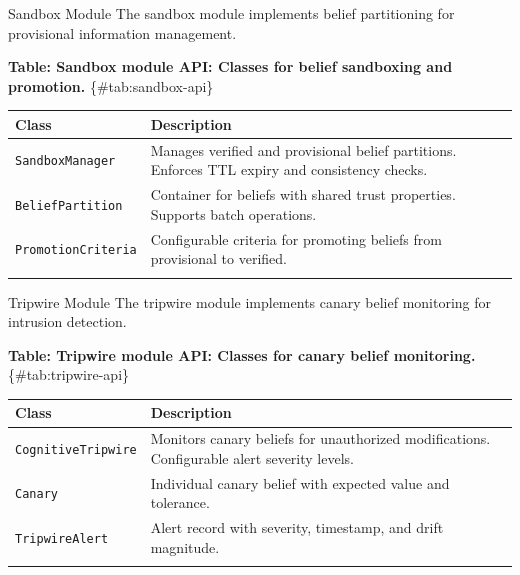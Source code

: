 \documentclass[
  ignorenonframetext,
]{beamer}
\newcounter{none} %
\begin{document}
\begin{frame}{Sandbox Module}
\protect{}\label{sec:sandbox-api}
The sandbox module implements belief partitioning for provisional
information management.

\textbf{Table: Sandbox module API: Classes for belief sandboxing and
promotion.} \{\#tab:sandbox-api\}

{\def\LTcaptype{none} %
\begin{longtable}[]{@{}
  >{\raggedright\arraybackslash}p{}
  >{\raggedright\arraybackslash}p{}@{}}
\toprule\noalign{}
\begin{minipage}[b]{\linewidth}\raggedright
Class
\end{minipage} & \begin{minipage}[b]{\linewidth}\raggedright
Description
\end{minipage} \\
\midrule\noalign{}
\endhead
\texttt{SandboxManager} & Manages verified and provisional belief
partitions. Enforces TTL expiry and consistency checks. \\
\texttt{BeliefPartition} & Container for beliefs with shared trust
properties. Supports batch operations. \\
\texttt{PromotionCriteria} & Configurable criteria for promoting beliefs
from provisional to verified. \\
\bottomrule\noalign{}
\end{longtable}
}
\end{frame}

\begin{frame}{Tripwire Module}
\protect{}\label{sec:tripwire-api}
The tripwire module implements canary belief monitoring for intrusion
detection.

\textbf{Table: Tripwire module API: Classes for canary belief
monitoring.} \{\#tab:tripwire-api\}

{\def\LTcaptype{none} %
\begin{longtable}[]{@{}
  >{\raggedright\arraybackslash}p{}
  >{\raggedright\arraybackslash}p{}@{}}
\toprule\noalign{}
\begin{minipage}[b]{\linewidth}\raggedright
Class
\end{minipage} & \begin{minipage}[b]{\linewidth}\raggedright
Description
\end{minipage} \\
\midrule\noalign{}
\endhead
\texttt{CognitiveTripwire} & Monitors canary beliefs for unauthorized
modifications. Configurable alert severity levels. \\
\texttt{Canary} & Individual canary belief with expected value and
tolerance. \\
\texttt{TripwireAlert} & Alert record with severity, timestamp, and
drift magnitude. \\
\bottomrule\noalign{}
\end{longtable}
}
\end{frame}
\end{document}
